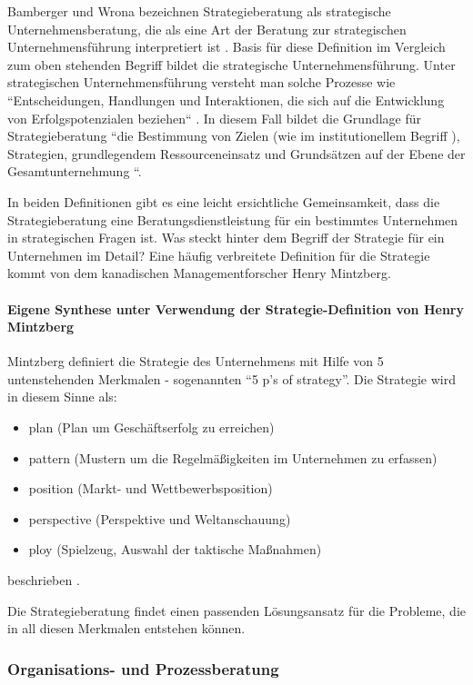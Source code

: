  Bamberger und Wrona bezeichnen Strategieberatung als strategische Unternehmensberatung, die als eine Art der Beratung zur strategischen Unternehmensführung interpretiert ist \cite[4]{BambergerWrona201205}. Basis für diese Definition im Vergleich zum oben stehenden Begriff bildet die strategische Unternehmensführung. Unter strategischen Unternehmensführung versteht man solche Prozesse wie ``Entscheidungen, Handlungen und Interaktionen, die sich auf die Entwicklung von Erfolgspotenzialen beziehen`` \cite[4]{BambergerWrona201205}.
 In diesem Fall bildet die Grundlage für Strategieberatung ``die Bestimmung von Zielen (wie im institutionellem Begriff ), Strategien, grundlegendem Ressourceneinsatz und Grundsätzen auf der Ebene der Gesamtunternehmung ``\cite[4]{BambergerWrona201205}.

In beiden Definitionen gibt es eine leicht ersichtliche  Gemeinsamkeit, dass die Strategieberatung eine Beratungsdienstleistung für ein bestimmtes Unternehmen in strategischen Fragen ist. 
Was steckt hinter dem Begriff der Strategie für ein Unternehmen im Detail? Eine häufig verbreitete Definition für die Strategie kommt von dem kanadischen Managementforscher Henry Mintzberg.


\paragraph*{Eigene Synthese unter Verwendung der Strategie-Definition von Henry Mintzberg} 
Mintzberg definiert die Strategie des Unternehmens mit Hilfe von 5 untenstehenden Merkmalen - sogenannten “5 p’s of strategy”.
Die Strategie wird in diesem Sinne als: 
\begin{itemize}

\item plan (Plan um Geschäftserfolg zu erreichen)
\item pattern (Mustern um die Regelmäßigkeiten im Unternehmen zu erfassen)
\item position (Markt- und Wettbewerbsposition)
\item perspective (Perspektive und Weltanschauung)
\item ploy (Spielzeug, Auswahl der taktische Maßnahmen) 
\end{itemize}
beschrieben \cite{5Ps}.

Die Strategieberatung findet einen passenden Lösungsansatz für die Probleme, die in all diesen Merkmalen  entstehen können.


\subsubsection*{Organisations- und Prozessberatung}

